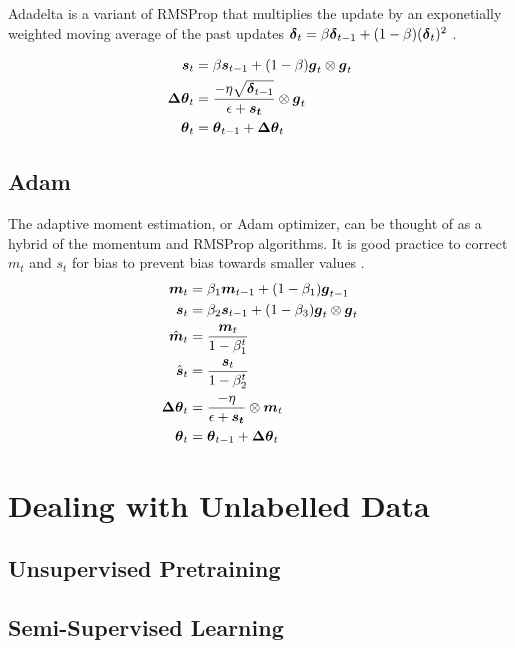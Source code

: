 \documentclass{article}
\begin{document}
Adadelta is a variant of RMSProp that multiplies the update by an exponetially weighted moving average of the past updates \(\vb*{\delta}_t = \beta \vb*{\delta}_{t-1} + (1-\beta)(\vb*{\delta}_t)^2\) \cite{pml1book} \cite{zeiler2012}.

\begin{align*}
    \vb*{s}_t &= \beta \vb*{s}_{t-1} + (1-\beta)\vb*{g}_t \otimes \vb*{g}_t \\
    \vb*{\Delta \theta}_t &= \frac{-\eta \sqrt{\vb*{\delta}_{t-1}}}{\epsilon + \vb*{s_t}} \otimes \vb*{g}_t \\
    \vb*{\theta}_t &= \vb*{\theta}_{t-1} + \vb*{\Delta \theta}_t
\end{align*}

\subsection{Adam} %

The adaptive moment estimation, or Adam optimizer, can be thought of as a hybrid of the momentum and RMSProp algorithms. It is good practice to correct \(m_t\) and \(s_t\) for bias to prevent bias towards smaller values \cite{pml1book}. %
\begin{align*}
    \vb*{m}_t &= \beta_1 \vb*{m}_{t-1} + (1-\beta_1)\vb*{g}_{t-1} \\
    \vb*{s}_t &= \beta_2 \vb*{s}_{t-1} + (1-\beta_3)\vb*{g}_t \otimes \vb*{g}_t \\
    \hat{\vb*{m}}_t &= \frac{\vb*{m}_t}{1-\beta^t_1} \\ 
    \hat{\vb*{s}}_t &= \frac{\vb*{s}_t}{1-\beta^t_2} \\ 
    \vb*{\Delta \theta}_t &= \frac{-\eta}{\epsilon + \vb*{s_t}} \otimes \vb*{m}_t \\
    \vb*{\theta}_t &= \vb*{\theta}_{t-1} + \vb*{\Delta \theta}_t
\end{align*}



\section{Dealing with Unlabelled Data}

\subsection{Unsupervised Pretraining}

\subsection{Semi-Supervised Learning} %
\end{document}
